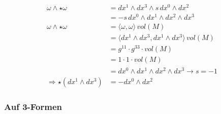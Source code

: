 \begin{align*}
	\omega \wedge \star \omega
	&=
	dx^1 \wedge dx^3 \wedge s \, dx^0 \wedge dx^2
	\\
	&=
	-s \, dx^0 \wedge dx^1 \wedge dx^2 \wedge dx^3
	\\
	\omega \wedge \star \omega
	&=
	\langle \omega, \omega \rangle \, vol(M)
	\\
	&=
	\langle dx^1 \wedge dx^3, dx^1 \wedge dx^3 \rangle \, vol(M)
	\\
	&=
	g^{11} \cdot g^{33} \cdot vol(M)
	\\
	&=
	1 \cdot 1 \cdot vol(M)
	\\
	&=
	dx^0 \wedge dx^1 \wedge dx^2 \wedge dx^3 \rightarrow s = -1
	\\
	\Rightarrow \star(dx^1 \wedge dx^3)
	&=
	-dx^0 \wedge dx^2
\end{align*}
\subsubsection{Auf 3-Formen}
